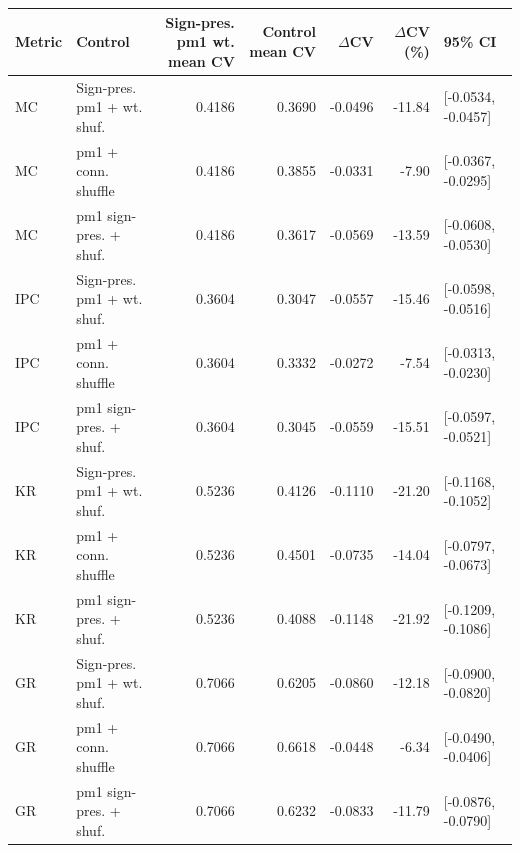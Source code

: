 \begin{tabular}{llrrrrl}
\toprule
Metric & Control & Sign-pres. pm1 wt. mean CV & Control mean CV & $\Delta$CV & $\Delta$CV (\%) & 95\% CI \\
\midrule
MC & Sign-pres. pm1 + wt. shuf. & 0.4186 & 0.3690 & -0.0496 & -11.84 & [-0.0534, -0.0457] \\
MC & pm1 + conn. shuffle & 0.4186 & 0.3855 & -0.0331 & -7.90 & [-0.0367, -0.0295] \\
MC & pm1 sign-pres. + shuf. & 0.4186 & 0.3617 & -0.0569 & -13.59 & [-0.0608, -0.0530] \\
IPC & Sign-pres. pm1 + wt. shuf. & 0.3604 & 0.3047 & -0.0557 & -15.46 & [-0.0598, -0.0516] \\
IPC & pm1 + conn. shuffle & 0.3604 & 0.3332 & -0.0272 & -7.54 & [-0.0313, -0.0230] \\
IPC & pm1 sign-pres. + shuf. & 0.3604 & 0.3045 & -0.0559 & -15.51 & [-0.0597, -0.0521] \\
KR & Sign-pres. pm1 + wt. shuf. & 0.5236 & 0.4126 & -0.1110 & -21.20 & [-0.1168, -0.1052] \\
KR & pm1 + conn. shuffle & 0.5236 & 0.4501 & -0.0735 & -14.04 & [-0.0797, -0.0673] \\
KR & pm1 sign-pres. + shuf. & 0.5236 & 0.4088 & -0.1148 & -21.92 & [-0.1209, -0.1086] \\
GR & Sign-pres. pm1 + wt. shuf. & 0.7066 & 0.6205 & -0.0860 & -12.18 & [-0.0900, -0.0820] \\
GR & pm1 + conn. shuffle & 0.7066 & 0.6618 & -0.0448 & -6.34 & [-0.0490, -0.0406] \\
GR & pm1 sign-pres. + shuf. & 0.7066 & 0.6232 & -0.0833 & -11.79 & [-0.0876, -0.0790] \\
\bottomrule
\end{tabular}
